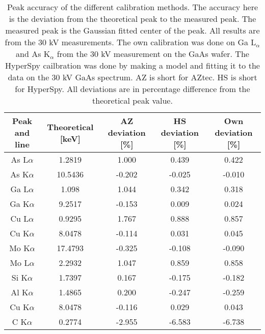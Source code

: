 
\begin{table}[ht]
    \centering
    \caption{
        Peak accuracy of the different calibration methods.
        The accuracy here is the deviation from the theoretical peak to the measured peak.
        The measured peak is the Gaussian fitted center of the peak.
        All results are from the 30 kV measurements.
        The own calibration was done on Ga L$_\alpha$ and As K$_\alpha$ from the 30 kV measurement on the GaAs wafer.
        The HyperSpy cailbration was done by making a model and fitting it to the data on the 30 kV GaAs spectrum.
        AZ is short for AZtec.
        HS is short for HyperSpy.
        All deviations are in percentage difference from the theoretical peak value.
    }
    \label{tab:results:calibration-peak-accuracy}
    \begin{tabular}{ccccc}
        Peak and line & Theoretical [keV] & AZ deviation [\%] & HS deviation [\%] & Own deviation [\%] \\
        \hline
        As L$\alpha$  & 1.2819            & 1.000             & 0.439             & 0.422              \\
        As K$\alpha$  & 10.5436           & -0.202            & -0.025            & -0.010             \\
        Ga L$\alpha$  & 1.098             & 1.044             & 0.342             & 0.318              \\
        Ga K$\alpha$  & 9.2517            & -0.153            & 0.009             & 0.024              \\
        Cu L$\alpha$  & 0.9295            & 1.767             & 0.888             & 0.857              \\
        Cu K$\alpha$  & 8.0478            & -0.114            & 0.031             & 0.045              \\
        Mo K$\alpha$  & 17.4793           & -0.325            & -0.108            & -0.090             \\
        Mo L$\alpha$  & 2.2932            & 1.047             & 0.859             & 0.858              \\
        Si K$\alpha$  & 1.7397            & 0.167             & -0.175            & -0.182             \\
        Al K$\alpha$  & 1.4865            & 0.200             & -0.247            & -0.259             \\
        Cu K$\alpha$  & 8.0478            & -0.116            & 0.029             & 0.043              \\
        C K$\alpha$   & 0.2774            & -2.955            & -6.583            & -6.738
    \end{tabular}
\end{table}